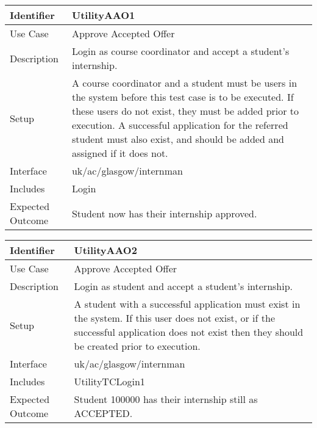 \begin{tabularx}{\textwidth}{|T|L|}
\hline
Identifier & UtilityAAO1\\
\hline
Use Case & Approve Accepted Offer \\
\hline
Description & Login as course coordinator and accept a student's internship.\\
\hline
Setup & A course coordinator and a student must be users in the system
before this test case is to be executed. If these users do not exist,
they must be added prior to execution. A successful application for
the referred student must also exist, and should be added and assigned
if it does not.\\
\hline
Interface & uk/ac/glasgow/internman \\
\hline
Includes & Login \\
\hline
Expected Outcome & Student now has their internship approved.\\
\hline
\end{tabularx}

\vspace{2em}

\begin{tabularx}{\textwidth}{|T|L|}
\hline
Identifier & UtilityAAO2\\
\hline
Use Case & Approve Accepted Offer \\
\hline
Description & Login as student and accept a student's internship.\\
\hline
Setup & A student with a successful application must exist in the
system. If this user does not exist, or if the successful application
does not exist then they should be created prior to execution. \\
\hline
Interface & uk/ac/glasgow/internman \\
\hline
Includes & UtilityTCLogin1 \\
\hline
Expected Outcome & Student 100000 has their internship still as ACCEPTED.\\
\hline
\end{tabularx}

\vspace{2em}


